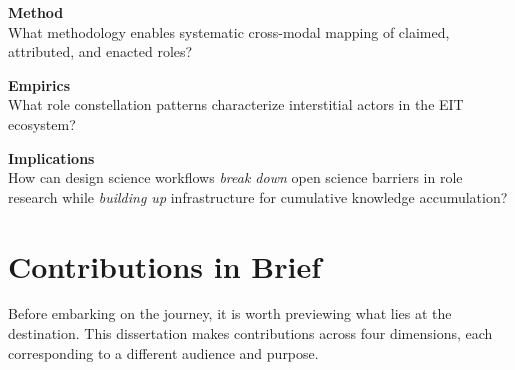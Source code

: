 \documentclass[../main.tex]{subfiles}
\begin{document}
\begin{subrq}
\textbf{Method}\\
What methodology enables systematic cross-modal mapping of claimed, attributed, and enacted roles?
\end{subrq}

\begin{subrq}
\textbf{Empirics}\\
What role constellation patterns characterize interstitial actors in the EIT ecosystem?
\end{subrq}

\begin{subrq}
\textbf{Implications}\\
How can design science workflows \emph{break down} open science barriers in role research while \emph{building up} infrastructure for cumulative knowledge accumulation?
\end{subrq}


\section{Contributions in Brief}
\label{sec:intro:contributions}

Before embarking on the journey, it is worth previewing what lies at the destination. This dissertation makes contributions across four dimensions, each corresponding to a different audience and purpose.
\end{document}
